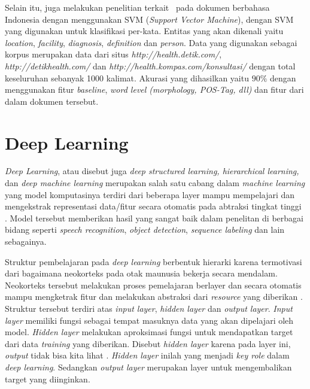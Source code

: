 Selain itu, \cite{suwarningsih2014imner} juga melakukan penelitian terkait \mer~pada dokumen berbahasa Indonesia dengan menggunakan SVM (\textit{Support Vector Machine}), dengan SVM yang digunakan untuk klasifikasi per-kata. Entitas yang akan dikenali yaitu \textit{location}, \textit{facility}, \textit{diagnosis}, \textit{definition} dan \textit{person}. Data yang digunakan sebagai korpus merupakan data dari situs \textit{http://health.detik.com/}, \textit{http://detikhealth.com/} dan \textit{http://health.kompas.com/konsultasi/} dengan total keseluruhan sebanyak 1000 kalimat. Akurasi yang dihasilkan yaitu $ 90\% $ dengan menggunakan fitur \textit{baseline}, \textit{word level (morphology, POS-Tag, dll)} dan fitur dari dalam dokumen tersebut.

\section{Deep Learning}
\textit{Deep Learning}, atau disebut juga \textit{deep structured learning, hierarchical learning,} dan \textit{deep machine learning} merupakan salah satu cabang dalam \textit{machine learning} yang model komputasinya terdiri dari beberapa layer mampu mempelajari dan mengekstrak representasi data/fitur secara otomatis pada abtraksi tingkat tinggi \citep{lecun2015deep}. Model tersebut memberikan hasil yang sangat baik dalam penelitan di berbagai bidang seperti \textit{speech recognition}, \textit{object detection}, \textit{sequence labeling} dan lain sebagainya.  

Struktur pembelajaran pada \textit{deep learning} berbentuk hierarki karena termotivasi dari bagaimana neokorteks pada otak maunusia bekerja secara mendalam. Neokorteks tersebut melakukan proses pemelajaran berlayer dan secara otomatis mampu mengketrak fitur dan melakukan abstraksi dari \textit{resource} yang diberikan \citep{bengio2007scaling}. Struktur tersebut terdiri atas \textit{input layer}, \textit{hidden layer} dan \textit{output layer}. \textit{Input layer} memiliki fungsi sebagai tempat masuknya data yang akan dipelajari oleh model. \textit{Hidden layer} melakukan aproksimasi fungsi untuk mendapatkan target dari data \textit{training} yang diberikan. Disebut \textit{hidden layer} karena pada layer ini, \textit{output} tidak bisa kita lihat \citep{Goodfellow-et-al-2016-Book}. \textit{Hidden layer} inilah yang menjadi \textit{key role} dalam \textit{deep learning}. Sedangkan \textit{output layer} merupakan layer untuk mengembalikan target yang diinginkan.

